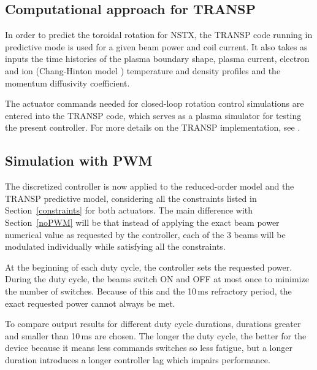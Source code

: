 \documentclass[12pt]{iopart}
\begin{document}
\subsection{Computational approach for TRANSP}
In order to predict the toroidal rotation for NSTX, the TRANSP code running in predictive mode is used for a given beam power and coil current. It also takes as inputs the time histories of the plasma boundary shape, plasma current, electron and ion (Chang-Hinton model \cite{Changhinton}) temperature and density profiles and the momentum diffusivity coefficient.

The actuator commands needed for closed-loop rotation control simulations are entered into the TRANSP code, which serves as a plasma simulator for testing the present controller. For more details on the TRANSP implementation, see \cite{Boyer15}.

\subsection{Simulation with PWM}
The discretized controller is now applied to the reduced-order model and the TRANSP predictive model, considering all the constraints listed in Section~\ref{constraints} for both actuators. The main difference with Section~\ref{noPWM} will be that instead of applying the exact beam power numerical value as requested by the controller, each of the 3 beams will be modulated individually while satisfying all the constraints.


At the beginning of each duty cycle, the controller sets the requested power. During the duty cycle, the beams switch ON and OFF at most once to minimize the number of switches. Because of this and the 10\,ms refractory period, the exact requested power cannot always be met.

 
To compare output results for different duty cycle durations, durations greater and smaller than 10\,ms are chosen. The longer the duty cycle, the better for the device because it means less commands switches so less fatigue, but a longer duration introduces a longer controller lag which impairs performance.
  
\end{document}
